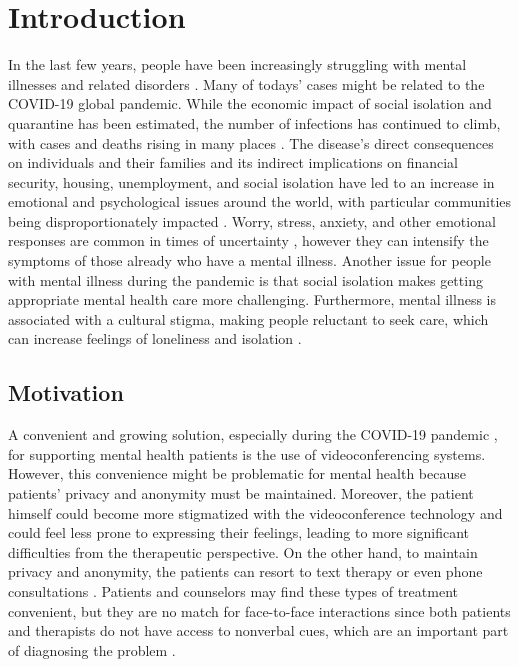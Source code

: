 \section{Introduction}
In the last few years, people have been increasingly struggling with mental illnesses and related disorders \cite{COS20, KUM21}. Many of todays' cases might be related to the COVID-19 global pandemic. While the economic impact of social isolation and quarantine has been estimated, the number of infections has continued to climb, with cases and deaths rising in many places \cite{CLA20, GAY20, RAS21}. The disease's direct consequences on individuals and their families and its indirect implications on financial security, housing, unemployment, and social isolation have led to an increase in emotional and psychological issues around the world, with particular communities being disproportionately impacted \cite{CLA20, GAY20, RAS21}. Worry, stress, anxiety, and other emotional responses are common in times of uncertainty \cite{EHR20, CHE20, JOH20}, however they can intensify the symptoms of those already who have a mental illness. Another issue for people with mental illness during the pandemic is that social isolation makes getting appropriate mental health care more challenging. Furthermore, mental illness is associated with a cultural stigma, making people reluctant to seek care, which can increase feelings of loneliness and isolation \cite{HAM18}.

\subsection{Motivation}
A convenient and growing solution, especially during the COVID-19 pandemic \cite{BOL20, BEK20, WIN20}, for supporting mental health patients is the use of videoconferencing systems. However, this convenience might be problematic for mental health because patients' privacy and anonymity must be maintained. Moreover, the patient himself could become more stigmatized with the videoconference technology \cite{BAT14, MAL22} and could feel less prone to expressing their feelings, leading to more significant difficulties from the therapeutic perspective. On the other hand, to maintain privacy and anonymity, the patients can resort to text therapy or even phone consultations \cite{AGY21, LIB21, AGU21, AGY20, ZHA20}. Patients and counselors may find these types of treatment convenient, but they are no match for face-to-face interactions since both patients and therapists do not have access to nonverbal cues, which are an important part of diagnosing the problem \cite{SUC12, LIN21}.

